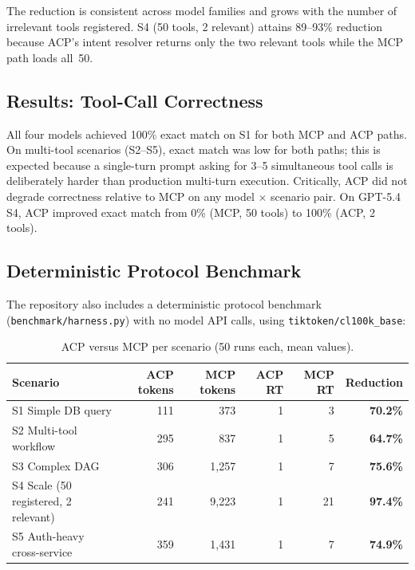 \documentclass[11pt,a4paper]{article}
\begin{document}
The reduction is consistent across model families and grows with the number
of irrelevant tools registered. S4 (50 tools, 2 relevant) attains 89--93\%
reduction because ACP's intent resolver returns only the two relevant tools
while the MCP path loads all~50.

\subsection{Results: Tool-Call Correctness}

All four models achieved 100\% exact match on S1 for both MCP and ACP paths.
On multi-tool scenarios (S2--S5), exact match was low for both paths; this is
expected because a single-turn prompt asking for 3--5 simultaneous tool calls
is deliberately harder than production multi-turn execution. Critically, ACP
did not degrade correctness relative to MCP on any model $\times$ scenario
pair. On GPT-5.4 S4, ACP improved exact match from 0\% (MCP, 50 tools) to
100\% (ACP, 2 tools).

\subsection{Deterministic Protocol Benchmark}

The repository also includes a deterministic protocol benchmark
(\texttt{benchmark/harness.py}) with no model API calls, using
\texttt{tiktoken/cl100k\_base}:

\begin{table}[h]
\centering
\caption{ACP versus MCP per scenario (50 runs each, mean values).}
\begin{tabular}{@{}lrrrrr@{}}
\toprule
Scenario & ACP tokens & MCP tokens & ACP RT & MCP RT & Reduction \\
\midrule
S1 Simple DB query                            &  111 &   373 & 1 &  3 & \textbf{70.2\%} \\
S2 Multi-tool workflow                        &  295 &   837 & 1 &  5 & \textbf{64.7\%} \\
S3 Complex DAG                                &  306 & 1,257 & 1 &  7 & \textbf{75.6\%} \\
S4 Scale (50 registered, 2 relevant)          &  241 & 9,223 & 1 & 21 & \textbf{97.4\%} \\
S5 Auth-heavy cross-service                   &  359 & 1,431 & 1 &  7 & \textbf{74.9\%} \\
\bottomrule
\end{tabular}
\end{table}
\end{document}
